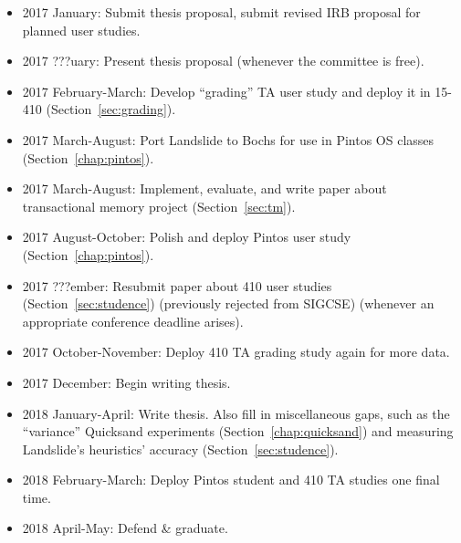 \documentclass[12pt]{cmuthesis}
\begin{document}
\begin{itemize}
	\item 2017 January: Submit thesis proposal, submit revised IRB proposal for planned user studies.
	\item 2017 ???uary: Present thesis proposal (whenever the committee is free).
	\item 2017 February-March: Develop ``grading'' TA user study and deploy it in 15-410 (Section~\ref{sec:grading}).
	\item 2017 March-August: Port Landslide to Bochs for use in Pintos OS classes (Section~\ref{chap:pintos}).
	\item 2017 March-August: Implement, evaluate, and write paper about transactional memory project (Section~\ref{sec:tm}).
	\item 2017 August-October: Polish and deploy Pintos user study (Section~\ref{chap:pintos}).
	\item 2017 ???ember: Resubmit paper about 410 user studies (Section~\ref{sec:studence}) (previously rejected from SIGCSE) (whenever an appropriate conference deadline arises).
	\item 2017 October-November: Deploy 410 TA grading study again for more data.
	\item 2017 December: Begin writing thesis.
	\item 2018 January-April: Write thesis. Also fill in miscellaneous gaps, such as the ``variance'' Quicksand experiments (Section~\ref{chap:quicksand}) and measuring Landslide's heuristics' accuracy (Section~\ref{sec:studence}).
	\item 2018 February-March: Deploy Pintos student and 410 TA studies one final time.
	\item 2018 April-May: Defend \& graduate.
\end{itemize}


%

\backmatter


\renewcommand{\bibsection}{\chapter{\bibname}}

\end{document}
